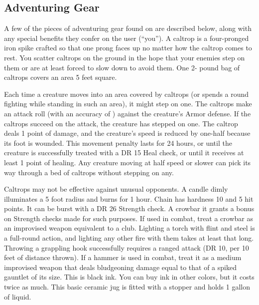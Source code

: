     \subsection{Adventuring Gear}
        A few of the pieces of adventuring gear found on  are described below, along with any special benefits they confer on the user (``you'').
         A caltrop is a four-pronged iron spike crafted so that one prong faces up no matter how the caltrop comes to rest. You scatter caltrops on the ground in the hope that your enemies step on them or are at least forced to slow down to avoid them. One 2- pound bag of caltrops covers an area 5 feet square.
        \par Each time a creature moves into an area covered by caltrops (or spends a round fighting while standing in such an area), it might step on one. The caltrops make an attack roll (with an accuracy of ) against the creature's Armor defense. If the caltrops succeed on the attack, the creature has stepped on one. The caltrop deals 1 point of damage, and the creature's speed is reduced by one-half because its foot is wounded. This movement penalty lasts for 24 hours, or until the creature is successfully treated with a DR 15 Heal check, or until it receives at least 1 point of healing. Any creature moving at half speed or slower can pick its way through a bed of caltrops without stepping on any.
        \par Caltrops may not be effective against unusual opponents.
         A candle dimly illuminates a 5 foot radius and burns for 1 hour.
         Chain has hardness 10 and 5 hit points. It can be burst with a DR 26 Strength check.
         A crowbar it grants a  bonus on Strength checks made for such purposes. If used in combat, treat a crowbar as an improvised weapon equivalent to a club.
         Lighting a torch with flint and steel is a full-round action, and lighting any other fire with them takes at least that long.
         Throwing a grappling hook successfully requires a ranged attack (DR 10,  per 10 feet of distance thrown).
         If a hammer is used in combat, treat it as a medium improvised weapon that deals bludgeoning damage equal to that of a spiked gauntlet of its size.
         This is black ink. You can buy ink in other colors, but it costs twice as much.
         This basic ceramic jug is fitted with a stopper and holds 1 gallon of liquid.
